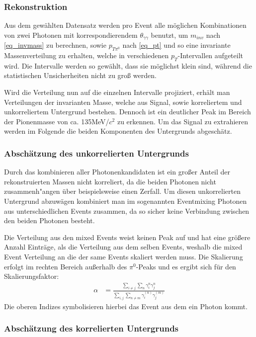 \documentclass[]{article}
\begin{document}
	
	\subsubsection{Rekonstruktion}
	Aus dem gew{\"a}hlten Datensatz werden pro Event alle m{\"o}glichen Kombinationen von zwei Photonen mit korrespondierendem $\theta_{\gamma\gamma}$ benutzt, um $m_{inv}$ nach \ref{eq_invmass} zu berechnen, sowie $p_{T\pi^{0}}$ nach \ref{eq_pt} und so eine invariante Massenverteilung zu erhalten, welche in verschiedenen $p_{T}$-Intervallen aufgeteilt wird. Die Intervalle werden so gew{\"a}hlt, dass sie m{\"o}glichst klein sind, w{\"a}hrend die statistischen Unsicherheiten nicht zu gro{\ss} werden.
	
	
	Wird die Verteilung nun auf die einzelnen Intervalle projiziert, erh{\"a}lt man Verteilungen der invarianten Masse, welche aus Signal, sowie korreliertem und unkorreliertem Untergrund bestehen. Dennoch ist ein deutlicher Peak im Bereich der Pionenmasse von ca. 135MeV/$c^{2}$ zu erkennen. Um das Signal zu extrahieren werden im Folgende die beiden Komponenten des Untergrunds abgesch{\"a}tz.
	
	\subsubsection{Absch{\"a}tzung des unkorrelierten Untergrunds}
	
	Durch das kombinieren aller Photonenkandidaten ist ein gro{\ss}er Anteil der rekonstruierten Massen nicht korreliert, da die beiden Photonen nicht zusammenh{"a}ngen {\"u}ber beispielsweise einen Zerfall. Um diesen unkorrelierten Untergrund abzuw{\"a}gen kombiniert man im sogenannten Eventmixing Photonen aus unterschiedlichen Events zusammen, da so sicher keine Verbindung zwischen den beiden Photonen besteht.
	
	
	Die Verteilung aus den mixed Events weist keinen Peak auf und hat eine gr{\"o}{\ss}ere Anzahl Eintr{\"a}ge, als die Verteilung aus dem selben Events, weshalb die mixed Event Verteilung an die der same Events skaliert werden muss. Die Skalierung erfolgt im rechten Bereich au{\ss}erhalb des $\pi^{0}$-Peaks und es ergibt sich f{\"u}r den Skalierungsfaktor:
	\begin{align}
	\alpha &= \frac{\sum_{i \neq j}\sum_{n}\gamma^{n}_{i}\gamma^{n}_{j}}{\sum_{i,j}\sum_{n \neq m}\gamma^{(n)}_{i}\gamma^{(m)}_{j}}
	\end{align}
	Die oberen Indizes symbolisieren hierbei das Event aus dem ein Photon kommt. 
	\subsubsection{Absch{\"a}tzung des korrelierten Untergrunds}
\end{document}
